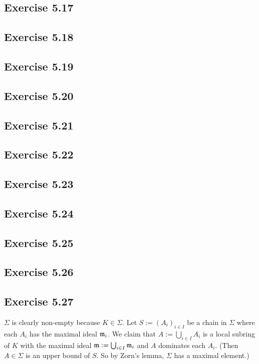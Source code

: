 \documentclass[../A&M.tex]{subfiles}
\begin{document}
\subsection*{Exercise 5.17}

\subsection*{Exercise 5.18}

\subsection*{Exercise 5.19}

\subsection*{Exercise 5.20}

\subsection*{Exercise 5.21}

\subsection*{Exercise 5.22}

\subsection*{Exercise 5.23}

\subsection*{Exercise 5.24}

\subsection*{Exercise 5.25}

\subsection*{Exercise 5.26}

\subsection*{Exercise 5.27}

$\Sigma$ is clearly non-empty because $K \in \Sigma$. Let $S:=(A_i)_{i\in I}$ be a chain in $\Sigma$ where each $A_i$ has the maximal ideal $\mathfrak{m}_i$. We claim that $A := \bigcup_{i\in I} A_i$ is a local subring of $K$ with the maximal ideal $\mathfrak{m} := \bigcup_{i\in I} \mathfrak{m}_i$ and $A$ dominates each $A_i$. (Then $A\in\Sigma$ is an upper bound of $S$. So by Zorn's lemma, $\Sigma$ has a maximal element.)
\end{document}
